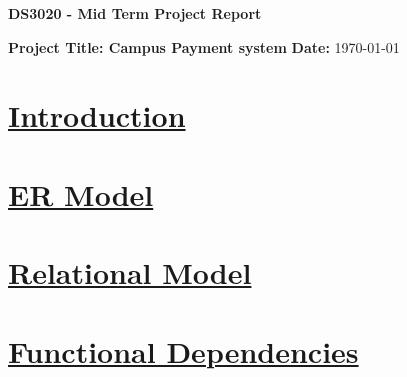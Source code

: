 \documentclass[a4paper,12pt]{article}
\begin{document}
\begin{center}
    \textbf{\Large DS3020 - Mid Term Project Report}
\end{center}
\vspace{0.5cm}

\noindent
\textbf{{Project Title}: Campus Payment system} \hfill \textbf{Date:} \today

\vspace{0.5cm}

\hline

\vspace{0.5cm}

\section*{\underline{Introduction}}

\section*{\underline{ER Model}}

\section*{\underline{Relational Model}}

\section*{\underline{Functional Dependencies}}
\end{document}

